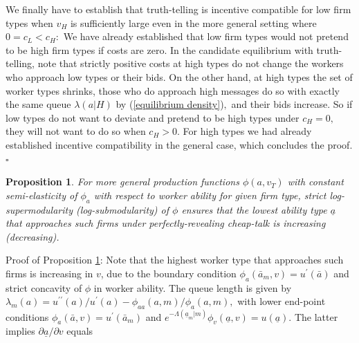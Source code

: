 \documentclass[12pt]{article}
\theoremstyle{plain}
\newtheorem{prop}{Proposition}
\begin{document}
We finally have to establish that truth-telling is incentive compatible for
low firm types when $v_{H}$ is sufficiently large even in the more general
setting where $0=c_{L}<c_{H}:$ We have already established that low firm
types would not pretend to be high firm types if costs are zero. In the
candidate equilibrium with truth-telling, note that strictly positive costs
at high types do not change the workers who approach low types or their
bids. On the other hand, at high types the set of worker types shrinks,
those who do approach high messages do so with exactly the same queue $%
\lambda (a|H)$ by (\ref{equilibrium density})$,$ and their bids increase. So
if low types do not want to deviate and pretend to be high types under $%
c_{H}=0,$ they will not want to do so when $c_{H}>0.$ For high types we had
already established incentive compatibility in the general case, which
concludes the proof. $\square $

\bigskip \bigskip

\begin{prop}
\label{extension} For more general production functions $\phi (a,v_{T})$
with constant semi-elasticity of $\phi _{a}$ with respect to worker ability for given firm type,
strict log-supermodularity (log-submodularity) of $\phi $ ensures that the
lowest ability type $\underline{a}$ that approaches such firms under
perfectly-revealing cheap-talk is increasing (decreasing).
\end{prop}

Proof of Proposition \ref{extension}: Note that the highest worker type that
approaches such firms is increasing in $v$, due to the boundary condition $%
\phi _{a}(\bar{a}_{m},v)=u^{\prime }(\bar{a})$ and strict concavity of $\phi 
$ in worker ability. The queue length is given by $\lambda _{m}(a)=u^{\prime
\prime }(a)/u^{\prime }(a)-\phi _{aa}(a,m)/\phi _{a}(a,m),$ with lower
end-point conditions $\phi _{a}(\bar{a},v)=u^{\prime }(\bar{a}_{m})$ and $%
e^{-\Lambda (\underline{a}_{m}|m)}\phi _{v}(\underline{a},v)=u(\underline{a}%
).$ The latter implies $\partial \underline{a}/\partial v$ equals
\end{document}
